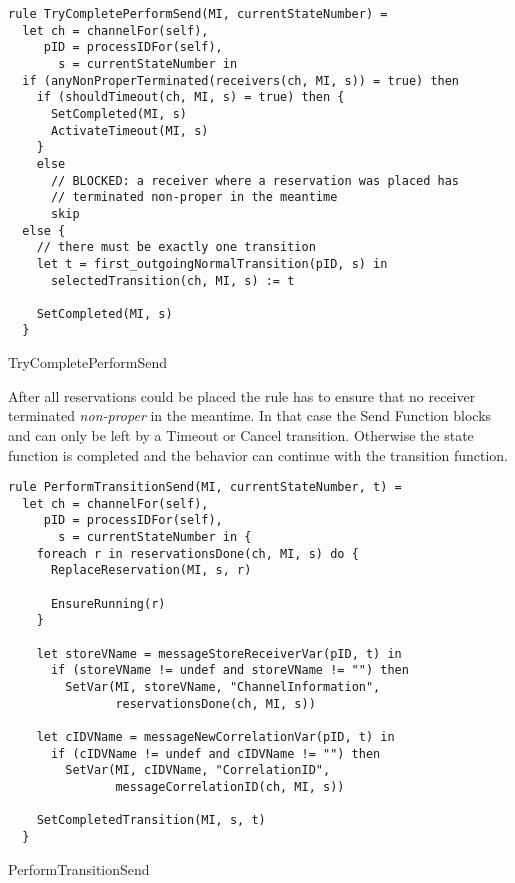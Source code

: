 \begin{listing}[htbp]
\begin{verbatim}
rule TryCompletePerformSend(MI, currentStateNumber) =
  let ch = channelFor(self),
     pID = processIDFor(self),
       s = currentStateNumber in
  if (anyNonProperTerminated(receivers(ch, MI, s)) = true) then
    if (shouldTimeout(ch, MI, s) = true) then {
      SetCompleted(MI, s)
      ActivateTimeout(MI, s)
    }
    else
      // BLOCKED: a receiver where a reservation was placed has
      // terminated non-proper in the meantime
      skip
  else {
    // there must be exactly one transition
    let t = first_outgoingNormalTransition(pID, s) in
      selectedTransition(ch, MI, s) := t

    SetCompleted(MI, s)
  }
\end{verbatim}
\caption{TryCompletePerformSend}
\label{lst:shortasm:TryCompletePerformSend}
\end{listing}


After all reservations could be placed the  rule has to ensure that no receiver terminated \textit{non-proper} in the meantime. In that case the Send Function blocks and can only be left by a Timeout or Cancel transition. Otherwise the state function is completed and the behavior can continue with the transition function.


\begin{listing}[htbp]
\begin{verbatim}
rule PerformTransitionSend(MI, currentStateNumber, t) =
  let ch = channelFor(self),
     pID = processIDFor(self),
       s = currentStateNumber in {
    foreach r in reservationsDone(ch, MI, s) do {
      ReplaceReservation(MI, s, r)

      EnsureRunning(r)
    }

    let storeVName = messageStoreReceiverVar(pID, t) in
      if (storeVName != undef and storeVName != "") then
        SetVar(MI, storeVName, "ChannelInformation",
               reservationsDone(ch, MI, s))

    let cIDVName = messageNewCorrelationVar(pID, t) in
      if (cIDVName != undef and cIDVName != "") then
        SetVar(MI, cIDVName, "CorrelationID",
               messageCorrelationID(ch, MI, s))

    SetCompletedTransition(MI, s, t)
  }
\end{verbatim}
\caption{PerformTransitionSend}
\label{lst:shortasm:PerformTransitionSend}
\end{listing}


